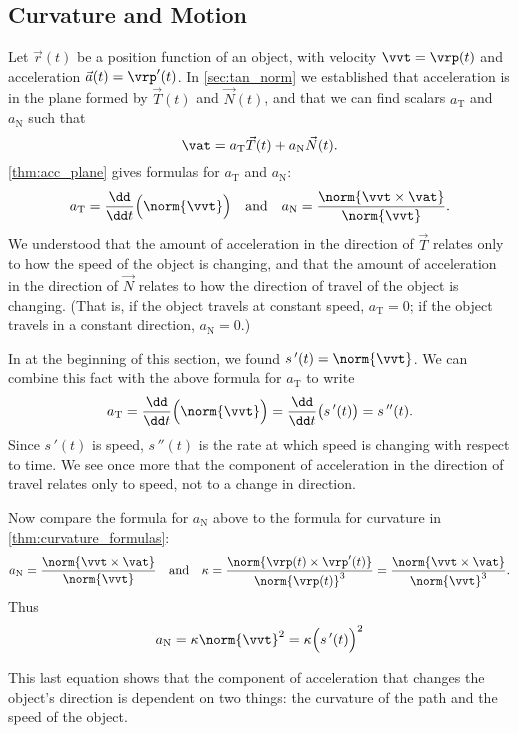 \subsection{Curvature and Motion}

Let $\vec r(t)$ be a position function of an object, with velocity $\vvt = \vrp(t)$ and acceleration $\vec a(t)=\vrp'(t)$. In \autoref{sec:tan_norm} we established that acceleration is in the plane formed by $\vec T(t)$ and $\vec N(t)$, and that we can find scalars $a_{\mathrm{T}}$ and $a_{\mathrm{N}}$ such that 
%
%
%
\[\vat = a_{\mathrm{T}}\vec T(t) + a_{\mathrm{N}}\vec N(t).\]
\autoref{thm:acc_plane} gives formulas for $a_{\mathrm{T}}$ and $a_{\mathrm{N}}$:
\[a_{\mathrm{T}} = \frac{\dd}{\dd t}\Bigl(\norm{\vvt}\Bigr) \quad \text{and} \quad a_{\mathrm{N}} = \frac{\norm{\vvt\times \vat}}{\norm{\vvt}}.\]
We understood that the amount of acceleration in the direction of $\vec T$ relates only to how the speed of the object is changing, and that the amount of acceleration in the direction of $\vec N$ relates to how the direction of travel of the object is changing. (That is, if the object travels at constant speed, $a_{\mathrm{T}}=0$; if the object travels in a constant direction, $a_{\mathrm{N}}=0$.)


In  at the beginning of this section, we found
$s\,'(t) = \norm{\vvt}$. We can combine this fact with the above formula for $a_{\mathrm{T}}$ to write
\[a_{\mathrm{T}} = \frac{\dd}{\dd t}\Bigl(\norm{\vvt}\Bigr) = \frac{\dd}{\dd t}\bigl( s\,'(t)\bigr) = s\,''(t).\]
Since $s\,'(t)$ is speed, $s\,''(t)$ is the rate at which speed is changing with respect to time. We see once more that the component of acceleration in the direction of travel relates only to speed, not to a change in direction.

Now compare the formula for $a_{\mathrm{N}}$ above to the formula for curvature in \autoref{thm:curvature_formulas}:
\[a_{\mathrm{N}} = \frac{\norm{\vvt\times \vat}}{\norm{\vvt}}\quad \text{and}\quad \kappa = \frac{\norm{\vrp(t)\times\vrp'(t)}}{\norm{\vrp(t)}^3}=\frac{\norm{\vvt\times \vat}}{\norm{\vvt}^3} .\]
Thus 
\begin{equation}\label{eq:curvature_an}
a_{\mathrm{N}} = \kappa \norm{\vvt}^2 = \kappa\Bigl(s\,'(t)\Bigr)^2
\end{equation}

This last equation shows that the component of acceleration that changes the object's direction is dependent on two things: the curvature of the path and the speed of the object.

